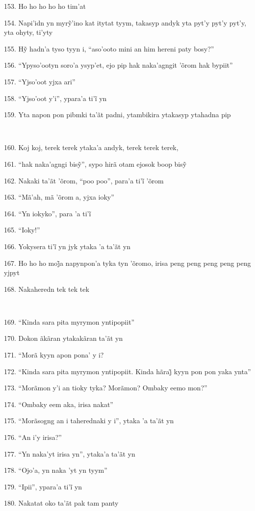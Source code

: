 153. Ho ho ho ho ho tim'at

154. Napi’idn yn myrỹ’ino kat itytat tyym, takasyp andyk yta pyt’y pyt’y pyt’y, yta ohyty, ti’yty

155. Hỹ hadn’a tyso tyyn i, “aso’ooto mini an him hereni paty bosy?”

156. ``Ypyso'ootyn soro'a ysyp'et, ejo pip hak naka'agngit 'õrom hak
bypiit''

157. ``Yjso'oot yjxa ari''

158. “Yjso’oot y’i”, ypara’a ti’ĩ yn

159. Yta napon pon pibmki ta'ãt padni, ytambikira ytakasyp ytahadna pip

~

160. Koj koj, terek terek ytaka'a andyk, terek terek terek,

161. “hak naka’agngi bisỹ”, sypo hirã otam ejosok boop bisỹ

162. Nakaki ta’ãt ’õrom, “poo poo”, para’a ti’ĩ ’õrom

163. ``Mã'ah, mã 'õrom a, yjxa ioky''

164. “Yn iokyko”, para ’a ti’ĩ

165. ``Ioky!''

166. Yokysera ti’ĩ yn jyk ytaka ’a ta’ãt yn

167. Ho ho ho moj̃a napynpon’a tyka tyn ’õromo, irisa peng peng peng peng peng yjpyt

168. Nakaheredn tek tek tek

~

169. ``Kinda sara pita myrymon yntipopiit''

170. Dokon ãkãran ytakakãran ta'ãt yn

171. ``Morã kyyn apon pona' y i?

172. “Kinda sara pita myrymon yntipopiit. Kinda hãraj̃ kyyn pon pon yaka ynta”

173. ``Morãmon y'i an tioky tyka? Morãmon? Ombaky eemo mon?''

174. ``Ombaky eem aka, irisa nakat''

175. ``Morãsogng an i taherednaki y i'', ytaka 'a ta'ãt yn

176. ``An i'y irisa?''

177. ``Yn naka'yt irisa yn'', ytaka'a ta'ãt yn

178. ``Ojo'a, yn naka 'yt yn tyym''

179. “Ipii”, ypara’a ti’ĩ yn

180. Nakatat oko ta'ãt pak tam panty

~

